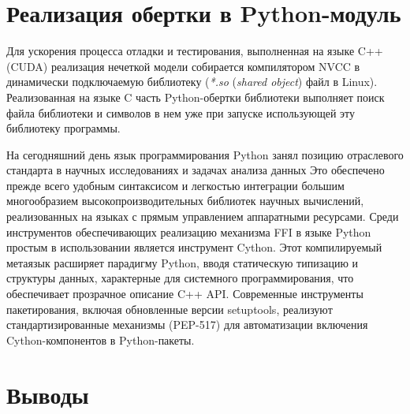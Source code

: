 \section{Реализация обертки в Python-модуль}

Для ускорения процесса отладки и тестирования, выполненная на языке C++ (CUDA) реализация нечеткой модели собирается компилятором NVCC в динамически подключаемую библиотеку (\textit{*.so} (\textit{shared object}) файл в Linux). Реализованная на языке C часть Python-обертки библиотеки выполняет поиск файла библиотеки и символов в нем уже при запуске использующей эту библиотеку программы.

На сегодняшний день язык программирования Python занял позицию отраслевого стандарта в научных исследованиях и задачах анализа данных  Это обеспечено прежде всего удобным синтаксисом и легкостью интеграции большим многообразием высокопроизводительных библиотек научных вычислений, реализованных на языках с прямым управлением аппаратными ресурсами. Среди инструментов обеспечивающих реализацию механизма FFI в языке Python простым в использовании является инструмент Cython. Этот компилируемый метаязык расширяет парадигму Python, вводя статическую типизацию и структуры данных, характерные для системного программирования, что обеспечивает прозрачное описание C++ API. Современные инструменты пакетирования, включая обновленные версии setuptools, реализуют стандартизированные механизмы (PEP-517) для автоматизации включения Cython-компонентов в Python-пакеты.

\section{Выводы}

